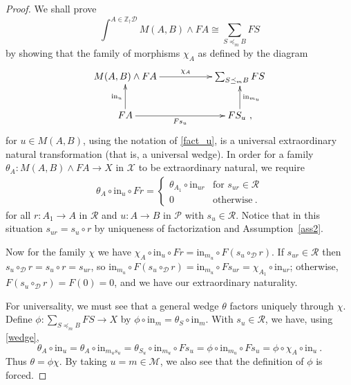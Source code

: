 \documentclass[a4paper,12pt,reqno]{amsart}
\theoremstyle{definition}
\theoremstyle{fact}
\theoremstyle{genquest}
\theoremstyle{step}
\newcommand{\dd}{\colon}
\newcommand{\ra}{\rightarrow}
\def\CD{{\mathscr D}}
\def\CM{{\mathscr M}}
\def\CP{{\mathscr P}}
\def\CR{{\mathscr R}}
\def\CX{{\mathscr X}}
\begin{document}
\begin{proof}
We shall prove $$\int^{A\in \mathbb{Z}_{\dagger}\CD}{M(A,B)\wedge FA} \cong \sum_{S\preceq_m B}{FS}$$
by showing that the family of morphisms $\chi_A$ as defined by the diagram
\begin{equation}
\begin{aligned}
\xymatrix{
M(A,B)\wedge FA \ar[rr]^-{\chi_A} && \sum_{S\preceq_m B}{FS}  \\ 
FA \ar[u]^-{\mathrm{in}_u} \ar[rr]_-{Fs_u} && FS_u \ar[u]_-{\mathrm{in}_{m_u}} \ ,}
\end{aligned}
\end{equation}
for $u\in M(A,B)$, using the notation of \eqref{fact_u}, 
is a universal extraordinary natural transformation (that is, a universal wedge). 
In order for a family $\theta_A \dd M(A,B)\wedge FA \ra X$ in $\CX$ to be
extraordinary natural, we require 
\begin{eqnarray}\label{wedge}
\theta_A\circ \mathrm{in}_u\circ Fr = 
\begin{cases}
\theta_{A_1}\circ \mathrm{in}_{ur} & \text{for }  s_{ur}\in \CR \\
0 & \text{otherwise} \ .
\end{cases}
\end{eqnarray}
for all $r\dd A_1\ra A$ in $\CR$ and $u\dd A\ra B$ in $\CP$ with $s_u \in \CR$.
Notice that in this situation $s_{ur} = s_u\circ r$ by uniqueness of factorization and Assumption~\ref{ass2}. 

Now for the family $\chi$ we have $\chi_A\circ \mathrm{in}_u\circ Fr =  \mathrm{in}_{m_u}\circ F(s_u\circ_{\CD}r)$. 
If $s_{ur}\in \CR$ then $s_u\circ_{\CD}r = s_u\circ r = s_{ur}$, so
$\mathrm{in}_{m_u}\circ F(s_u\circ_{\CD}r) = \mathrm{in}_{m_u}\circ Fs_{ur} = \chi_{A_1} \circ \mathrm{in}_{ur}$; otherwise, $F(s_u\circ_{\CD}r) = F(0) = 0$, and we have our extraordinary naturality.

For universality, we must see that a general wedge $\theta$ factors uniquely through $\chi$.
Define $\phi \dd \sum_{S\preceq_m B}{FS} \ra X$ by $\phi \circ \mathrm{in}_m = \theta_S\circ \mathrm{in}_m$.
With $s_u\in \CR$, we have, using \eqref{wedge}, 
$$\theta_A \circ \mathrm{in}_u =  \theta_A \circ \mathrm{in}_{m_us_u} = 
\theta_{S_u}\circ \mathrm{in}_{m_u} \circ Fs_u = \phi \circ \mathrm{in}_{m_u} \circ Fs_u = \phi \circ \chi_A \circ \mathrm{in}_u  \ .$$
Thus $\theta =  \phi \chi$. By taking $u=m\in \CM$, we also see that the definition of $\phi$ is forced. 


\end{proof}
\end{document}

